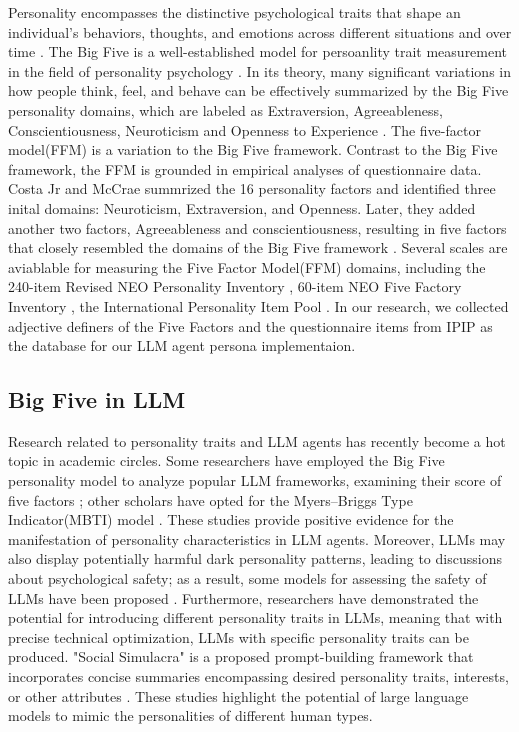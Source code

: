 Personality encompasses the distinctive psychological traits that shape an individual's behaviors, thoughts, and emotions across different situations and over time \citep{roberts2000rank}. The Big Five is a well-established model for persoanlity trait measurement in the field of personality psychology \citep{john2008paradigm}. In its theory, many significant variations in how people think, feel, and behave can be effectively summarized by the Big Five personality domains, which are labeled as Extraversion, Agreeableness, Conscientiousness, Neuroticism and Openness to Experience \citep{costa1999five}. The five-factor model(FFM) is a variation to the Big Five framework. Contrast to the Big Five framework, the FFM is grounded in empirical analyses of questionnaire data. Costa Jr and McCrae \citep{costa1976age} summrized the 16 personality factors \citep{cattell1992handbook} and identified three inital domains: Neuroticism, Extraversion, and Openness. Later, they added another two factors, Agreeableness and conscientiousness, resulting in five factors that closely resembled the domains of the Big Five framework \citep{mccrae1987validation}. Several scales are aviablable for measuring the Five Factor Model(FFM) domains, including the 240-item Revised NEO Personality Inventory \citep{mccrae1991neo,costa2008revised}, 60-item NEO Five Factory Inventory \citep{mccrae1989neo,mccrae2004contemplated}, the International Personality Item Pool \citep{goldberg2006international}. In our research, we collected adjective definers of the Five Factors \citep{mccrae2004contemplated} and the questionnaire items from IPIP \citep{goldberg2006international} as the database for our LLM agent persona implementaion. 

\subsection{Big Five in LLM} \label{sec:big_five_llm}

Research related to personality traits and LLM agents has recently become a hot topic in academic circles. Some researchers have employed the Big Five personality model to analyze popular LLM frameworks, examining their score of five factors \citep{karra2022estimating,caron2022identifying}; other scholars have opted for the Myers–Briggs Type Indicator(MBTI) model \citep{pan2023llms}. These studies provide positive evidence for the manifestation of personality characteristics in LLM agents. Moreover, LLMs may also display potentially harmful dark personality patterns, leading to discussions about psychological safety; as a result, some models for assessing the safety of LLMs have been proposed \citep{li2022does}. Furthermore, researchers \citep{safdari2023personality} have demonstrated the potential for introducing different personality traits in LLMs, meaning that with precise technical optimization, LLMs with specific personality traits can be produced. "Social Simulacra" is a proposed prompt-building framework that incorporates concise summaries encompassing desired personality traits, interests, or other attributes \citep{park2022social}. These studies highlight the potential of large language models to mimic the personalities of different human types.
